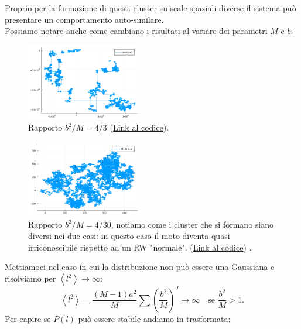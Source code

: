 \noindent
Proprio per la formazione di questi cluster su scale spaziali diverse il sistema può presentare un comportamento auto-similare.\\
Possiamo notare anche come cambiano i risultati al variare dei parametri $M$ e $b$:
\begin{figure}[H]
    \centering
    \includegraphics[width=0.45\textwidth]{figures/lez_10_Weier_M_3_b_2.png}
    \caption{\scriptsize Rapporto $b^2 /M = 4 /3 $ (\href{https://github.com/dodogabrie/Sistemi-Complessi/blob/master/python-project/lezione10/Weierstrass_julia.ipynb}{Link al codice}).}
    \label{fig:figures-lez_10_Weier_M_3_b_2-png}
\end{figure}
\begin{figure}[H]
    \centering
    \includegraphics[width=0.45\textwidth]{figures/lez_10_Weier_M_30_b_2.png}
    \caption{\scriptsize Rapporto $b^2 /M = 4 /30$, notiamo come i cluster che si formano siano diversi nei due casi: in questo caso il moto diventa quasi irriconoscibile rispetto ad un RW "normale". (\href{https://github.com/dodogabrie/Sistemi-Complessi/blob/master/python-project/lezione10/Weierstrass_julia.ipynb}{Link al codice}) .}
    \label{fig:figures-lez_10_Weier_M_3_b_2-png}
\end{figure}
\noindent
Mettiamoci nel caso in cui la distribuzione non può essere una Gaussiana e risolviamo per $\left<l^2\right>\to \infty$:
\[
    \left<l^2\right> = \frac{\left(M-1\right)a^2}{M}\sum_{}^{} \left(\frac{b^2}{M}\right)^J\to \infty \quad \text{se }\frac{b^2}{M}>1
.\] 
Per capire se $P(l)$ può essere stabile andiamo in trasformata:
